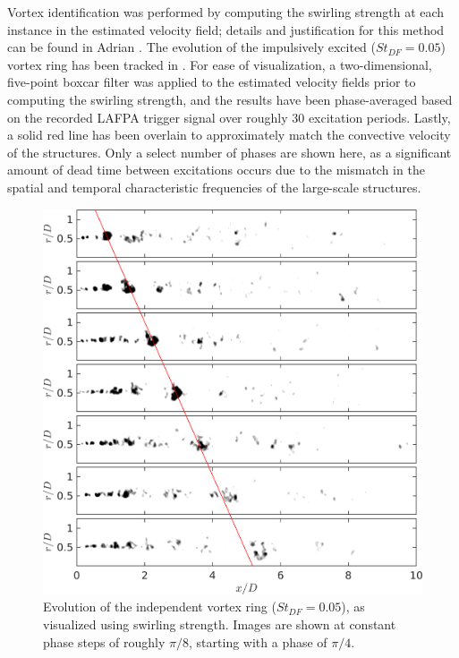 Vortex identification was performed by computing the swirling strength at each instance in the estimated velocity field; details and justification for this method can be found in Adrian \etal \citep{Adrian2000}.
The evolution of the impulsively excited ($St_{DF} = 0.05$) vortex ring has been tracked in .
For ease of visualization, a two-dimensional, five-point boxcar filter was applied to the estimated velocity fields prior to computing the swirling strength, and the results have been phase-averaged based on the recorded LAFPA trigger signal over roughly 30 excitation periods.
Lastly, a solid red line has been overlain to approximately match the convective velocity of the structures.
Only a select number of phases are shown here, as a significant amount of dead time between excitations occurs due to the mismatch in the spatial and temporal characteristic frequencies of the large-scale structures.
\begin{figure}
	\centering
	\includegraphics[width=5in]{Figures/ch4_St005_lambda.png}
	\caption{Evolution of the independent vortex ring ($St_{DF}=0.05$), as visualized using swirling strength. Images are shown at constant phase steps of roughly $\pi/8$, starting with a phase of $\pi/4$.}
	\label{fig:ch4_impulse_structure_disintegration}
\end{figure}

